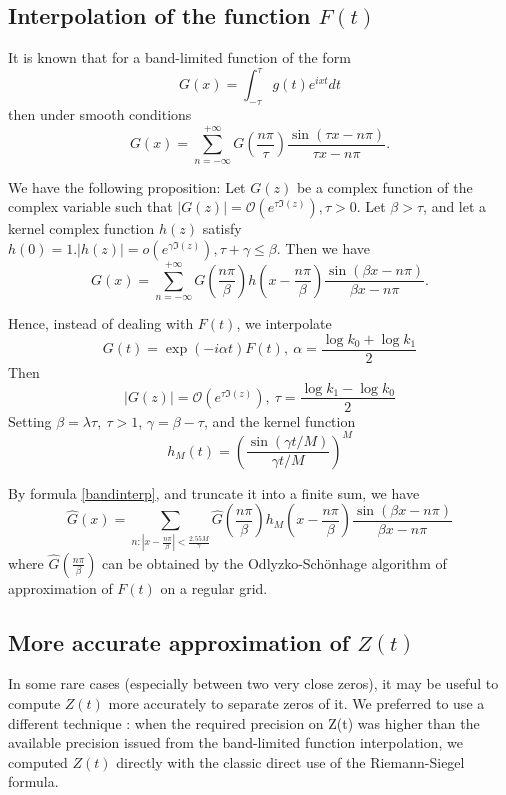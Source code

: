 \documentclass[conference,9pt]{IEEEtran}
\theoremstyle{definition}
\begin{document}
\subsection{Interpolation of the function $F(t)$}
It is known that for a band-limited function of the form $$G(x)=\int_{-\tau}^{\tau}g(t)e^{ixt}dt$$then under smooth conditions
\begin{equation}
    G(x)=\sum_{n=-\infty}^{+\infty}G(\frac{n\pi}{\tau})\frac{\sin(\tau x-n\pi)}{\tau x-n\pi}.
\end{equation}

We have the following proposition: Let $G(z)$ be a complex function of the complex variable such that $|G(z)|=\mathcal{O}(e^{\tau \Im(z)}),\tau>0$. Let $\beta>\tau$, and let a kernel complex function $h(z)$ satisfy $h(0)=1.|h(z)|=o(e^{\gamma\Im(z)}),\tau+\gamma\leq\beta$. Then we have
\begin{equation}
    \label{bandinterp}
    G(x)=\sum_{n=-\infty}^{+\infty}G\left(\frac{n\pi}{\beta}\right)h\left(x-\frac{n\pi}{\beta}\right)\frac{\sin(\beta x-n\pi)}{\beta x-n\pi}.
\end{equation}


Hence, instead of dealing with $F(t)$, we interpolate $$G(t)=\exp(-i\alpha t)F(t),\ \alpha=\frac{\log k_0+\log k_1}{2}$$Then $$|G(z)|=\mathcal{O}(e^{\tau \Im(z)}),\ \tau=\frac{\log k_1-\log k_0}{2}$$
Setting $\beta=\lambda\tau,\ \tau>1$, $\gamma=\beta-\tau$, and the kernel function $$h_M(t)=\left(\frac{\sin(\gamma t/M)}{\gamma t/M}\right)^M$$

By formula \ref{bandinterp}, and truncate it into a finite sum, we have
\begin{equation}
    \widehat{G}(x)=\sum_{n:|x-\frac{n\pi}{\beta}|<\frac{2.55M}{\gamma}}\widehat{G}\left(\frac{n\pi}{\beta}\right)h_M\left(x-\frac{n\pi}{\beta}\right)\frac{\sin(\beta x-n\pi)}{\beta x-n\pi}
\end{equation}
where $\widehat{G}\left(\frac{n\pi}{\beta}\right)$ can be obtained by the Odlyzko-Sch{\" o}nhage algorithm of approximation of $F(t)$ on a regular grid.

\subsection{More accurate approximation of $Z(t)$}
In some rare cases (especially between two very close zeros), it may be useful to compute $Z(t)$ more accurately to separate zeros of it. We preferred to use
a different technique : when the required precision on Z(t) was higher than the available
precision issued from the band-limited function interpolation, we computed $Z(t)$ directly with
the classic direct use of the Riemann-Siegel formula. 
\end{document}
